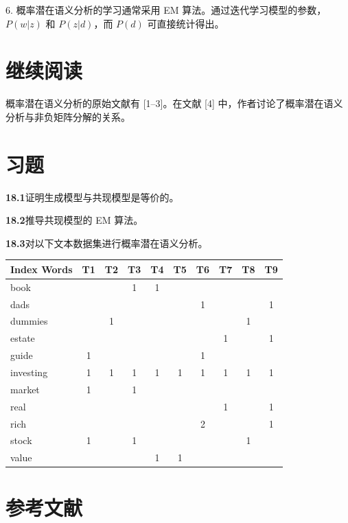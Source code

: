 \documentclass[UTF8, 12pt, fontset=fandol, oneside]{ctexart}
\begin{document}
6. 概率潜在语义分析的学习通常采用 EM 算法。通过迭代学习模型的参数，$P(w|z)$ 和 $P(z|d)$，而 $P(d)$ 可直接统计得出。

\section*{继续阅读}

概率潜在语义分析的原始文献有 [1--3]。在文献 [4] 中，作者讨论了概率潜在语义分析与非负矩阵分解的关系。

\section*{习题}

\noindent\textbf{18.1}\quad 证明生成模型与共现模型是等价的。

\noindent\textbf{18.2}\quad 推导共现模型的 EM 算法。

\noindent\textbf{18.3}\quad 对以下文本数据集进行概率潜在语义分析。

\begin{center}
\small
\begin{tabular}{lccccccccc}
\hline
Index Words & T1 & T2 & T3 & T4 & T5 & T6 & T7 & T8 & T9\\
\hline
book      &   &   & 1 & 1 &   &   &   &   &  \\
dads      &   &   &   &   &   & 1 &   &   & 1\\
dummies   &   & 1 &   &   &   &   &   & 1 &  \\
estate    &   &   &   &   &   &   & 1 &   & 1\\
guide     & 1 &   &   &   &   & 1 &   &   &  \\
investing & 1 & 1 & 1 & 1 & 1 & 1 & 1 & 1 & 1\\
market    & 1 &   & 1 &   &   &   &   &   &  \\
real      &   &   &   &   &   &   & 1 &   & 1\\
rich      &   &   &   &   &   & 2 &   &   & 1\\
stock     & 1 &   & 1 &   &   &   &   & 1 &  \\
value     &   &   &   & 1 & 1 &   &   &   &  \\
\hline
\end{tabular}
\end{center}

\section*{参考文献}
\end{document}
